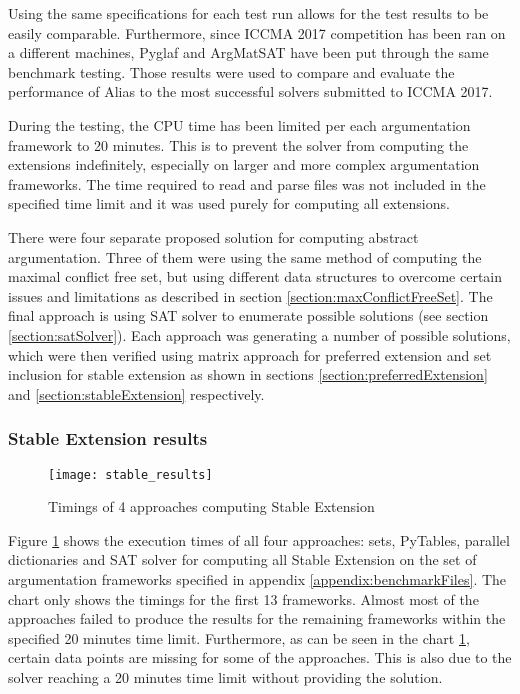 Using the same specifications for each test run allows for the test results to be easily comparable. Furthermore, since ICCMA 2017 competition has been ran on a different machines, Pyglaf \citep{pyglaf} and ArgMatSAT \citep{argmatSat} have been put through the same benchmark testing. Those results were used to compare and evaluate the performance of Alias to the most successful solvers submitted to ICCMA 2017.

During the testing, the CPU time has been limited per each argumentation framework to 20 minutes. This is to prevent the solver from computing the extensions indefinitely, especially on larger and more complex argumentation frameworks. The time required to read and parse files was not included in the specified time limit and it was used purely for computing all extensions. 

There were four separate proposed solution for computing abstract argumentation. Three of them were using the same method of computing the maximal conflict free set, but using different data structures to overcome certain issues and limitations as described in section \ref{section:maxConflictFreeSet}. The final approach is using SAT solver to enumerate possible solutions (see section \ref{section:satSolver}). Each approach was generating a number of possible solutions, which were then verified using matrix approach for preferred extension and set inclusion for stable extension as shown in sections \ref{section:preferredExtension} and \ref{section:stableExtension} respectively. 

\subsubsection{Stable Extension results}

\begin{figure}[h]
	\texttt{[image: stable\_results]}
	\caption{Timings of 4 approaches computing Stable Extension}
	\label{fig:stableFinalResults}
\end{figure}

Figure \ref{fig:stableFinalResults} shows the execution times of all four approaches: sets, PyTables, parallel dictionaries and SAT solver for computing all Stable Extension on the set of argumentation frameworks specified in appendix \ref{appendix:benchmarkFiles}. The chart only shows the timings for the first 13 frameworks. Almost most of the approaches failed to produce the results for the remaining frameworks within the specified 20 minutes time limit. Furthermore, as can be seen in the chart \ref{fig:stableFinalResults}, certain data points are missing for some of the approaches. This is also due to the solver reaching a 20 minutes time limit without providing the solution. 

